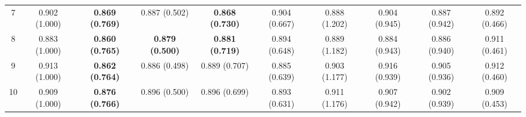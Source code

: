 \begin{table}[!h]
{\begin{tabular}[t]{|c|ccccccccc|}
\hspace{1em}7 & 0.902 (1.000) & \textbf{0.869 (0.769)} & 0.887 (0.502) & \textbf{0.868 (0.730)} & 0.904 (0.667) & 0.888 (1.202) & 0.904 (0.945) & 0.887 (0.942) & 0.892 (0.466)\\
\hspace{1em}8 & 0.883 (1.000) & \textbf{0.860 (0.765)} & \textbf{0.879 (0.500)} & \textbf{0.881 (0.719)} & 0.894 (0.648) & 0.889 (1.182) & 0.884 (0.943) & 0.886 (0.940) & 0.911 (0.461)\\
\hspace{1em}9 & 0.913 (1.000) & \textbf{0.862 (0.764)} & 0.886 (0.498) & 0.889 (0.707) & 0.885 (0.639) & 0.903 (1.177) & 0.916 (0.939) & 0.905 (0.936) & 0.912 (0.460)\\
\hspace{1em}10 & 0.909 (1.000) & \textbf{0.876 (0.766)} & 0.896 (0.500) & 0.896 (0.699) & 0.893 (0.631) & 0.911 (1.176) & 0.907 (0.942) & 0.902 (0.939) & 0.909 (0.453)\\
\hline
\end{tabular}}
\end{table}
